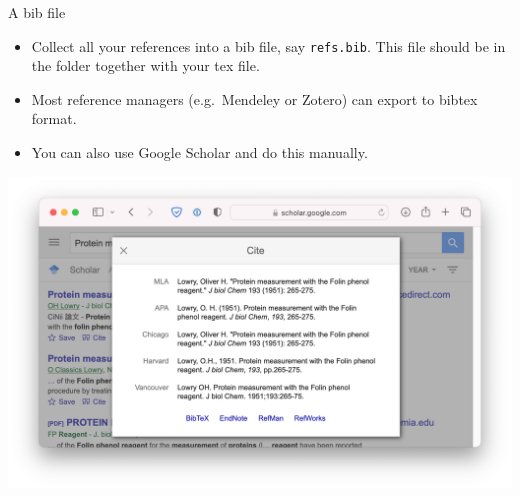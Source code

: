 \documentclass[,aspectratio=43]{beamer}
\begin{document}
\begin{frame}[fragile]{A bib file}
\protect\hypertarget{a-bib-file}{}
\begin{itemize}
\item
  Collect all your references into a bib file, say \texttt{refs.bib}.
  This file should be in the folder together with your tex file.
\item
  Most reference managers (e.g.~Mendeley or Zotero) can export to bibtex
  format.
\item
  You can also use Google Scholar and do this manually.
\end{itemize}

\begin{center}\includegraphics[width=0.72\linewidth]{figure/googlescholar} \end{center}
\end{frame}
\end{document}
